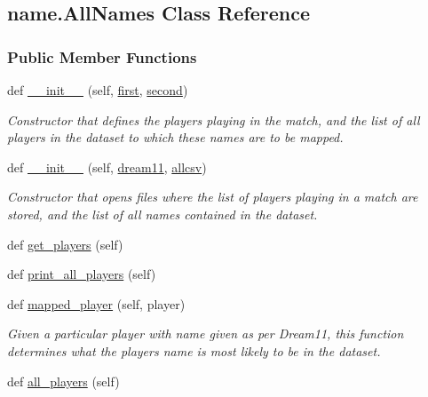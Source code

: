 \hypertarget{classname_1_1AllNames}{}\subsection{name.\+All\+Names Class Reference}
\label{classname_1_1AllNames}
\subsubsection*{Public Member Functions}
\begin{DoxyCompactItemize}
\item 
def \hyperlink{classname_1_1AllNames_ac3662eb1bdbc32f6a3baa780a8d6a18c}{\+\_\+\+\_\+init\+\_\+\+\_\+} (self, \hyperlink{classname_1_1AllNames_af05034a1d261190ebd396ee615052d8e}{first}, \hyperlink{classname_1_1AllNames_a414e627444762afcc47ead0015f1dcce}{second})
\begin{DoxyCompactList}\small\item\em Constructor that defines the players playing in the match, and the list of all players in the dataset to which these names are to be mapped. \end{DoxyCompactList}\item 
def \hyperlink{classname_1_1AllNames_a28c4e3248f60738f445089b1fe8dfe42}{\+\_\+\+\_\+init\+\_\+\+\_\+} (self, \hyperlink{classname_1_1AllNames_a3fe1dd6f5e33b95faf2eca8d8dce3cc1}{dream11}, \hyperlink{classname_1_1AllNames_a1c94841db2dd8ff636014a0029e11673}{allcsv})
\begin{DoxyCompactList}\small\item\em Constructor that opens files where the list of players playing in a match are stored, and the list of all names contained in the dataset. \end{DoxyCompactList}\item 
def \hyperlink{classname_1_1AllNames_a766b1d340e8df73fa313e7ceec65c150}{get\+\_\+players} (self)
\item 
def \hyperlink{classname_1_1AllNames_a224ad6b8dff67b909fd7bddfdbe0244f}{print\+\_\+all\+\_\+players} (self)
\item 
def \hyperlink{classname_1_1AllNames_a9cd51d0c9394ed62cfc62c688dc5434f}{mapped\+\_\+player} (self, player)
\begin{DoxyCompactList}\small\item\em Given a particular player with name given as per Dream11, this function determines what the player\textquotesingle{}s name is most likely to be in the dataset. \end{DoxyCompactList}\item 
def \hyperlink{classname_1_1AllNames_a9de21d794d9868b1d42fb103f6643ba7}{all\+\_\+players} (self)
\end{DoxyCompactItemize}
